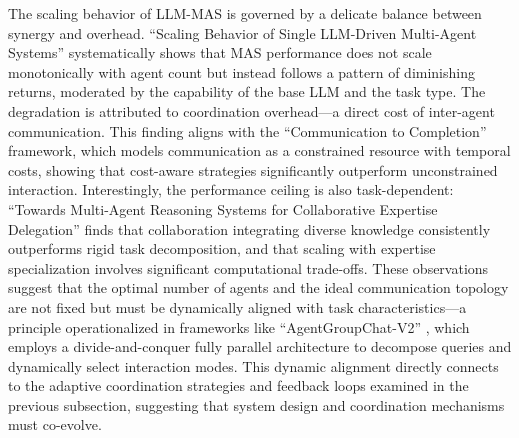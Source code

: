 \documentclass[11pt]{article}
\begin{document}
The scaling behavior of LLM-MAS is governed by a delicate balance between synergy and overhead. ``Scaling Behavior of Single LLM-Driven Multi-Agent Systems'' \cite{ref28} systematically shows that MAS performance does not scale monotonically with agent count but instead follows a pattern of diminishing returns, moderated by the capability of the base LLM and the task type. The degradation is attributed to coordination overhead---a direct cost of inter-agent communication. This finding aligns with the ``Communication to Completion'' \cite{ref105} framework, which models communication as a constrained resource with temporal costs, showing that cost-aware strategies significantly outperform unconstrained interaction. Interestingly, the performance ceiling is also task-dependent: ``Towards Multi-Agent Reasoning Systems for Collaborative Expertise Delegation'' \cite{ref106} finds that collaboration integrating diverse knowledge consistently outperforms rigid task decomposition, and that scaling with expertise specialization involves significant computational trade-offs. These observations suggest that the optimal number of agents and the ideal communication topology are not fixed but must be dynamically aligned with task characteristics---a principle operationalized in frameworks like ``AgentGroupChat-V2'' \cite{ref107}, which employs a divide-and-conquer fully parallel architecture to decompose queries and dynamically select interaction modes. This dynamic alignment directly connects to the adaptive coordination strategies and feedback loops examined in the previous subsection, suggesting that system design and coordination mechanisms must co-evolve.
\end{document}
